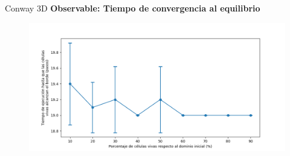 \begin{frame}{Conway 3D}
    \textbf{Observable: Tiempo de convergencia al equilibrio}
    \begin{figure}[H]
        \centering
        \includegraphics[width=0.8\linewidth]{pic/conway3d/time_vs_input}
        \label{fig:conway3d:time:density}
    \end{figure}
\end{frame}






